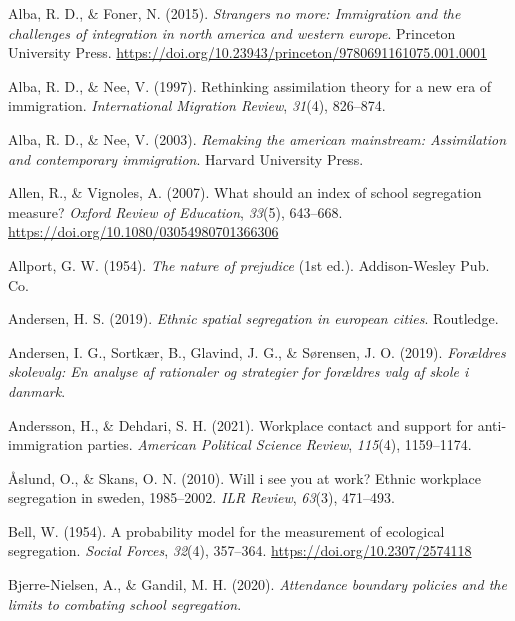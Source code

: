 \documentclass[
]{book}
\newlength{\cslhangindent}
\newenvironment{CSLReferences}[2] %
 {\begin{list}{}{%
  \setlength{\itemindent}{0pt}
  \setlength{\leftmargin}{0pt}
  \setlength{\parsep}{0pt}
  \ifodd #1
   \setlength{\leftmargin}{\cslhangindent}
   \setlength{\itemindent}{-1\cslhangindent}
  \fi
  \setlength{\itemsep}{#2\baselineskip}}}
 {\end{list}}
\begin{document}
\label{refs}
\begin{CSLReferences}{1}{0}
Alba, R. D., \& Foner, N. (2015). \emph{Strangers no more: Immigration and the challenges of integration in north america and western europe}. Princeton University Press. \url{https://doi.org/10.23943/princeton/9780691161075.001.0001}

Alba, R. D., \& Nee, V. (1997). Rethinking assimilation theory for a new era of immigration. \emph{International Migration Review}, \emph{31}(4), 826--874.

Alba, R. D., \& Nee, V. (2003). \emph{Remaking the american mainstream: Assimilation and contemporary immigration}. Harvard University Press.

Allen, R., \& Vignoles, A. (2007). What should an index of school segregation measure? \emph{Oxford Review of Education}, \emph{33}(5), 643--668. \url{https://doi.org/10.1080/03054980701366306}

Allport, G. W. (1954). \emph{The nature of prejudice} (1st ed.). Addison-Wesley Pub. Co.

Andersen, H. S. (2019). \emph{Ethnic spatial segregation in european cities}. Routledge.

Andersen, I. G., Sortkær, B., Glavind, J. G., \& Sørensen, J. O. (2019). \emph{Forældres skolevalg: En analyse af rationaler og strategier for forældres valg af skole i danmark}.

Andersson, H., \& Dehdari, S. H. (2021). Workplace contact and support for anti-immigration parties. \emph{American Political Science Review}, \emph{115}(4), 1159--1174.

Åslund, O., \& Skans, O. N. (2010). Will i see you at work? Ethnic workplace segregation in sweden, 1985--2002. \emph{ILR Review}, \emph{63}(3), 471--493.

Bell, W. (1954). A probability model for the measurement of ecological segregation. \emph{Social Forces}, \emph{32}(4), 357--364. \url{https://doi.org/10.2307/2574118}

Bjerre-Nielsen, A., \& Gandil, M. H. (2020). \emph{Attendance boundary policies and the limits to combating school segregation}.


\end{CSLReferences}
\end{document}
